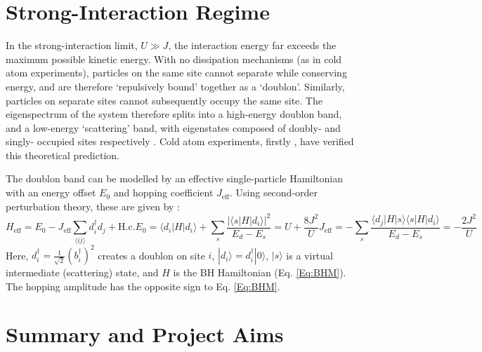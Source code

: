 \section{Strong-Interaction Regime}\label{Sec:DoublonTheory}

In the strong-interaction limit, $U \gg J$, the interaction energy far exceeds the maximum possible kinetic energy. With no dissipation mechanisms (as in cold atom experiments), particles on the same site cannot separate while conserving energy, and are therefore `repulsively bound' together as a `doublon'. Similarly, particles on separate sites cannot subsequently occupy the same site. The eigenspectrum of the system therefore splits into a high-energy doublon band, and a low-energy `scattering' band, with eigenstates composed of doubly- and singly- occupied sites respectively \cite{Valiente08,Deuchert}. Cold atom experiments, firstly \cite{Winkler}, have verified this theoretical prediction. 

The doublon band can be modelled by an effective single-particle Hamiltonian with an energy offset $E_0$ and hopping coefficient $J_{\text{eff}}$. Using second-order perturbation theory, these are given by \cite{Salerno}:
\begin{subequations}\label{Eq:DoublonHamiltonian}
    \begin{equation}
        H_{\text{eff}}=E_0 - J_\text{eff}\sum_{\langle ij \rangle} d_i^{\dag}d_j + \text{H.c.}
    \end{equation}
    \begin{equation}
        E_0 = \langle d_i |H|d_i\rangle + \sum_{s}\frac{|\langle s |H|d_i \rangle|^2}{E_{d}-E_{s}}=U + \frac{8J^2}{U}
    \end{equation}
    \begin{equation}
        J_{\text{eff}}=-\sum_{s}\frac{\langle d_j|H|s \rangle \langle s |H| d_i \rangle}{E_d - E_{s}}=-\frac{2J^2}{U}
    \end{equation}
\end{subequations}
Here, $d_i^{\dag}=\frac{1}{\sqrt{2}}(b_i^{\dag})^2$ creates a doublon on site $i$, $|d_i \rangle=d_i^{\dag}|0\rangle$, $|s \rangle$ is a virtual intermediate (scattering) state, and $H$ is the BH Hamiltonian (Eq. \ref{Eq:BHM}). The hopping amplitude has the opposite sign to Eq. \ref{Eq:BHM}. 

\section{Summary and Project Aims}\label{Sec:ProjectAims}

